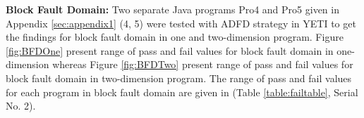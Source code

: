 

\noindent \textbf{Block Fault Domain:}  Two separate Java programs Pro4 and Pro5 given in Appendix \ref{sec:appendix1} (4, 5) were tested with ADFD strategy in YETI to get the findings for block fault domain in one and two-dimension program. Figure \ref{fig:BFDOne} present range of pass and fail values for block fault domain in one-dimension whereas Figure \ref{fig:BFDTwo} present range of pass and fail values for block fault domain in two-dimension program. The range of pass and fail values for each program in block fault domain are given in (Table \ref{table:failtable}, Serial No. 2).





